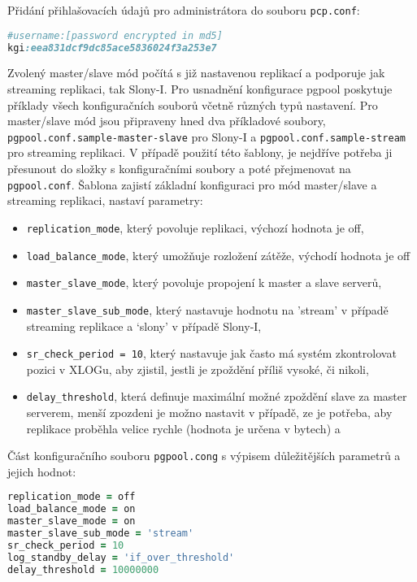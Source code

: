 Přidání přihlašovacích údajů pro administrátora do souboru \texttt{pcp.conf}:
\begin{lstlisting}[language=ruby]
#username:[password encrypted in md5]
kgi:eea831dcf9dc85ace5836024f3a253e7
\end{lstlisting}


Zvolený master/slave mód počítá s již nastavenou replikací a podporuje jak streaming replikaci, tak Slony-I. Pro usnadnění konfigurace pgpool poskytuje příklady všech konfiguračních souborů včetně různých typů nastavení. Pro master/slave mód jsou připraveny hned dva příkladové soubory, \texttt{pgpool.conf.sample-master-slave} pro Slony-I a \texttt{pgpool.conf.sample-stream} pro streaming replikaci. V případě použití této šablony, je nejdříve potřeba ji přesunout do složky s konfiguračními soubory a poté přejmenovat na \texttt{pgpool.conf}. Šablona zajistí základní konfiguraci pro mód master/slave a streaming replikaci, nastaví parametry:
\begin{itemize}
\item \texttt{replication\_mode}, který povoluje replikaci, výchozí hodnota je off, 
\item \texttt{load\_balance\_mode}, který umožňuje rozložení zátěže, východí hodnota je off
\item \texttt{master\_slave\_mode}, který povoluje propojení k master a slave serverů, 
\item \texttt{master\_slave\_sub\_mode}, který nastavuje hodnotu na 'stream’ v případě streaming replikace a ‘slony' v případě Slony-I, 
\item \texttt{sr\_check\_period = 10}, který nastavuje jak často má systém zkontrolovat pozici v XLOGu, aby zjistil, jestli je zpoždění příliš vysoké, či nikoli, 
\item \texttt{delay\_threshold}, která definuje maximální možné zpoždění slave za master serverem, menší zpozdeni je možno nastavit v případě, ze je potřeba, aby replikace proběhla velice rychle (hodnota je určena v bytech) a 
\end{itemize}

Část konfiguračního souboru \texttt{pgpool.cong} s výpisem důležitějších parametrů a jejich hodnot:
\begin{lstlisting}[language=ruby]
replication_mode = off	
load_balance_mode = on	
master_slave_mode = on	
master_slave_sub_mode = 'stream'
sr_check_period = 10
log_standby_delay = 'if_over_threshold'
delay_threshold = 10000000 
\end{lstlisting}

